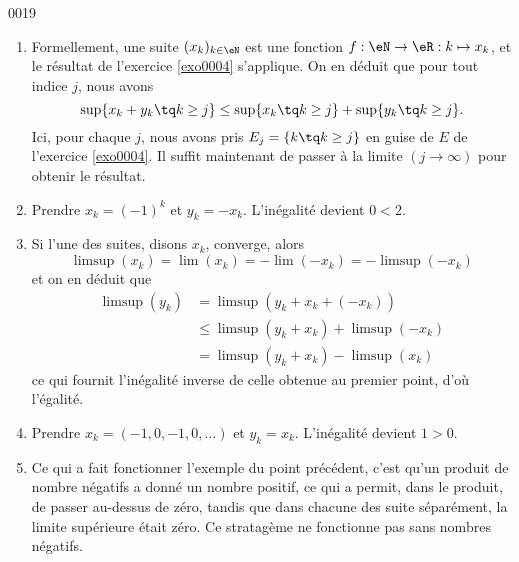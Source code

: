 
\begin{corrige}{0019}

\begin{enumerate}
\item Formellement, une suite $(x_k)_{k\in\eN}$ est une fonction $f : \eN \to \eR : k \mapsto x_k$, et le résultat de l'exercice \ref{exo0004} s'applique. On en déduit que pour tout indice $j$, nous avons
 \begin{equation*}
    \sup\{ x_k + y_k \tq k \geq j \} \leq   \sup\{ x_k \tq k \geq j \} +  \sup\{ y_k \tq k \geq j \}.
  \end{equation*}
Ici, pour chaque $j$, nous avons pris $E_j=\{ k\tq k\geq j \}$ en guise de $E$ de l'exercice \ref{exo0004}. Il suffit maintenant de passer à la limite $(j \to \infty)$ pour obtenir le résultat.
\item
Prendre $x_k = (-1)^k$ et $y_k = -x_k$. L'inégalité devient $0 <
  2$.

\item Si l'une des suites, disons $x_k$, converge, alors
  \begin{equation*}
    \limsup (x_k) = \lim (x_k) = - \lim(-x_k) = - \limsup (-x_k)
  \end{equation*}
  et on en déduit que
  \begin{equation*}
    \begin{split}
      \limsup (y_k) &= \limsup(y_k + x_k + (-x_k))\\
      &\leq \limsup(y_k + x_k) + \limsup (-x_k)\\
      &= \limsup(y_k + x_k) - \limsup (x_k)
    \end{split}
  \end{equation*}
  ce qui fournit l'inégalité inverse de celle obtenue au premier
  point, d'où l'égalité.

\item Prendre $x_k = (-1, 0, -1, 0, \ldots)$ et $y_k =
  x_k$. L'inégalité devient $1 > 0$.

\item 

Ce qui a fait fonctionner l'exemple du point précédent, c'est qu'un produit de nombre négatifs a donné un nombre positif, ce qui a permit, dans le produit,  de passer au-dessus de zéro, tandis que dans chacune des suite séparément, la limite supérieure était zéro. Ce stratagème ne fonctionne pas sans nombres négatifs.


\end{enumerate}
\end{corrige}
